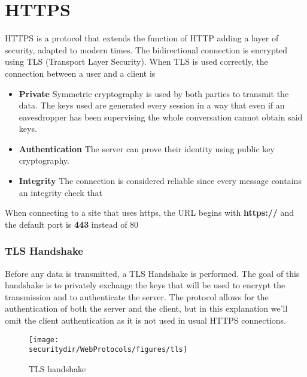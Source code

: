 \section{HTTPS}

HTTPS is a protocol that extends the function of HTTP adding a layer of security, adapted to modern times. The bidirectional connection is encrypted using TLS (Transport Layer Security).
When TLS is used correctly, the connection between a user and a client is
\begin{itemize}
	\item \textbf{Private} Symmetric cryptography is used by both parties to transmit the data. The keys used are generated every session in a way that even if an eavesdropper has been supervising the  whole conversation cannot obtain said keys.
	\item \textbf{Authentication} The server can prove their identity using public key cryptography.
	\item \textbf{Integrity} The connection is considered reliable since every message contains an integrity check that 
\end{itemize}
When connecting to a site that uses https, the URL begins with \textbf{https://} and the default port is \textbf{443} instead of 80


\subsubsection{TLS Handshake}
Before any data is transmitted, a TLS Handshake is performed. The goal of this handshake is to privately exchange the keys that will be used to encrypt the transmission and to authenticate the server. The protocol allows for the authentication of both the server and the client, but in this explanation we'll omit the client authentication as it is not used in usual HTTPS connections. 

\begin{figure}[htb]
	\begin{centering}
		\texttt{[image: \\securitydir/WebProtocols/figures/tls]}
		\par
	\end{centering}
	\caption{\label{fig:tls} TLS handshake}
\end{figure}



